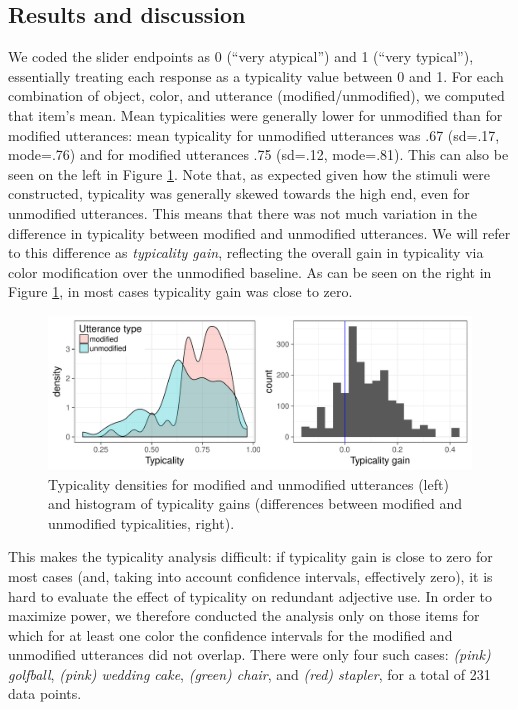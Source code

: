 \documentclass[11pt]{article}
\newcommand{\figref}[1]{Figure \ref{#1}}
\begin{document}
\subsection{Results and discussion}

We coded the slider endpoints as 0 (``very atypical'') and 1 (``very typical''), essentially treating each response as a typicality value between 0 and 1. For each combination of object, color, and utterance (modified/unmodified), we computed that item's mean. Mean typicalities were generally lower for unmodified than for modified utterances: mean typicality for unmodified utterances was .67 (sd=.17, mode=.76) and for modified utterances .75 (sd=.12, mode=.81). This can also be seen on the left in \figref{fig:typicalitydists}. Note that, as expected given how the stimuli were constructed, typicality was generally skewed towards the high end, even for unmodified utterances. This means that there was not much variation in  the difference in typicality between modified and unmodified utterances. We will refer to this difference as \emph{typicality gain}, reflecting the overall gain in typicality via color modification over the unmodified baseline. As can be seen on the right in \figref{fig:typicalitydists}, in most cases typicality gain was close to zero.

\begin{figure}
\centering
\includegraphics[width=.9\textwidth]{pics/typicality-dists}
\caption{Typicality densities for modified and unmodified utterances (left) and histogram of typicality gains (differences between modified and unmodified typicalities, right).}
\label{fig:typicalitydists}
\end{figure}

This makes the typicality analysis difficult: if typicality gain is close to zero for most cases (and, taking into account confidence intervals, effectively zero), it is hard to evaluate the effect of typicality on redundant adjective use. In order to maximize power, we therefore conducted the analysis only on those items for which for at least one color the confidence intervals for the modified and unmodified utterances did not overlap. There were only four such cases: \emph{(pink) golfball}, \emph{(pink) wedding cake}, \emph{(green) chair}, and \emph{(red) stapler}, for a total of 231 data points.
\end{document}
